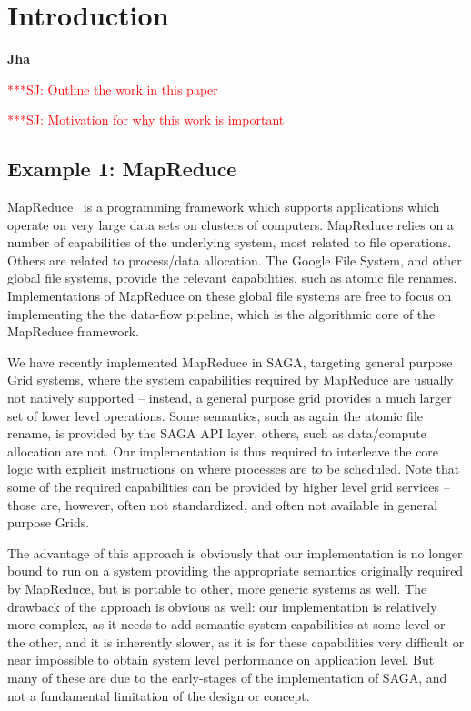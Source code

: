 \documentclass{rspublic}
\newcommand{\jhanote}[1]{ {\textcolor{red} { ***SJ: #1 }}}
\newcommand{\jhanote}[1]{}
\begin{document}
\section{Introduction} {\bf Jha} 

\jhanote{Outline the work in this paper}

\jhanote{Motivation for why this work is important}


\subsection{Example 1: MapReduce}

MapReduce~\cite{mapreduce-paper} is a programming framework which
supports applications which operate on very large data sets on
clusters of computers.  MapReduce relies on a number of capabilities
of the underlying system, most related to file operations.  Others are 
related to process/data allocation.  The Google File System, and other
global file systems, provide the relevant capabilities, such as atomic
file renames.  Implementations of MapReduce on these global file systems
are free to focus on implementing the the data-flow pipeline, which is the
algorithmic core of the MapReduce framework.

We have recently implemented MapReduce in SAGA, targeting general
purpose Grid systems, where the system capabilities required by
MapReduce are usually not natively supported -- instead, a general
purpose grid provides a much larger set of lower level operations.
Some semantics, such as again the atomic file rename, is provided by
the SAGA API layer, others, such as data/compute allocation are not.
Our implementation is thus required to interleave the core logic with
explicit instructions on where processes are to be scheduled.  Note that
some of the required capabilities can be provided by higher level grid
services -- those are, however, often not standardized, and often not
available in general purpose Grids.

The advantage of this approach is obviously that our implementation is
no longer bound to run on a system providing the appropriate semantics
originally required by MapReduce, but is portable to other, more
generic systems as well.  The drawback of the approach is obvious as
well: our implementation is relatively more complex, as it needs to
add semantic system capabilities at some level or the other, and it is
inherently slower, as it is for these capabilities very difficult or
near impossible to obtain system level performance on application
level.  But many of these are due to the early-stages of the
implementation of SAGA, and not a fundamental limitation of the design
or concept.
\end{document}
